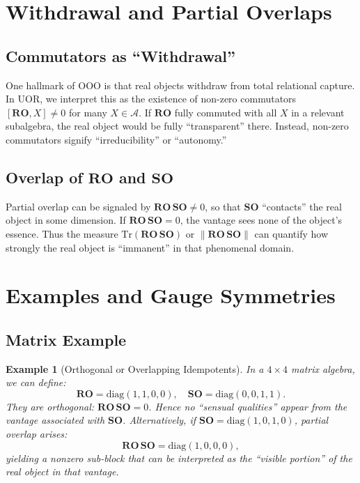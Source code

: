 \documentclass[11pt]{article}
\newtheorem{example}[theorem]{Example}
\begin{document}

\section{Withdrawal and Partial Overlaps}
\label{sec:withdrawal}

\subsection{Commutators as “Withdrawal”}
One hallmark of OOO is that real objects withdraw from total relational capture. 
In UOR, we interpret this as the existence of non-zero commutators 
$[\mathbf{RO},X]\neq0$ for many $X \in \mathcal{A}$. 
If $\mathbf{RO}$ fully commuted with all $X$ in a relevant subalgebra, 
the real object would be fully “transparent” there. Instead, 
non-zero commutators signify “irreducibility” or “autonomy.”

\subsection{Overlap of \(\mathbf{RO}\) and \(\mathbf{SO}\)}
Partial overlap can be signaled by $\mathbf{RO}\,\mathbf{SO}\neq0$, 
so that $\mathbf{SO}$ “contacts” the real object in some dimension. 
If $\mathbf{RO}\,\mathbf{SO}=0$, the vantage sees none of the object’s essence. 
Thus the measure $\mathrm{Tr}(\mathbf{RO}\,\mathbf{SO})$ or 
$\|\mathbf{RO}\,\mathbf{SO}\|$ can quantify how strongly the real object 
is “immanent” in that phenomenal domain.


\section{Examples and Gauge Symmetries}
\label{sec:gauge}

\subsection{Matrix Example}
\begin{example}[Orthogonal or Overlapping Idempotents]
In a $4\times4$ matrix algebra, we can define:
\[
\mathbf{RO} = \mathrm{diag}(1,1,0,0),\quad
\mathbf{SO} = \mathrm{diag}(0,0,1,1).
\]
They are orthogonal: $\mathbf{RO}\,\mathbf{SO}=0$. 
Hence no “sensual qualities” appear from the vantage associated with $\mathbf{SO}$. 
Alternatively, if $\mathbf{SO} = \mathrm{diag}(1,0,1,0)$, partial overlap arises:
\[
\mathbf{RO}\,\mathbf{SO} 
= 
\mathrm{diag}(1,0,0,0),
\]
yielding a nonzero sub-block that can be interpreted as the “visible portion” 
of the real object in that vantage.
\end{example}
\end{document}
